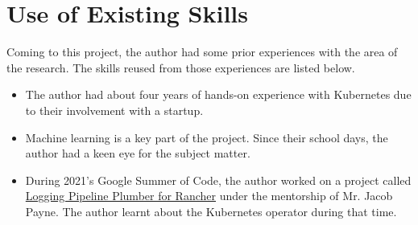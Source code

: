 \section{Use of Existing Skills}

Coming to this project, the author had some prior experiences with the area of the research. The skills reused from those experiences are listed below.

\begin{itemize}[noitemsep,nolistsep]
    \item The author had about four years of hands-on experience with Kubernetes due to their involvement with a startup.
    \item Machine learning is a key part of the project. Since their school days, the author had a keen eye for the subject matter.
    \item During 2021's Google Summer of Code, the author worked on a project called \href{https://github.com/MrSupiri/rancher-logging-pipeline-plumber}{Logging Pipeline Plumber for Rancher} under the mentorship of Mr. Jacob Payne. The author learnt about the Kubernetes operator during that time.
\end{itemize}